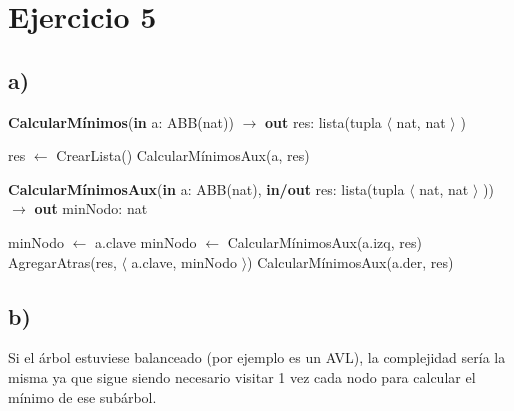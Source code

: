 \section*{Ejercicio 5}

\subsection*{a)}

\begin{algorithm}[H]
\caption{
    \textbf{CalcularMínimos}(\textbf{in} a: ABB(nat)) $\to$ \textbf{out} res: lista(tupla $\langle$ nat, nat $\rangle$ )
}
\begin{algorithmic}[1]
    \State res $\gets$ CrearLista() 
        \State CalcularMínimosAux(a, res) 
    \EndIf
\end{algorithmic}
\end{algorithm}

\begin{algorithm}[H]
\caption{
    \textbf{CalcularMínimosAux}(\textbf{in} a: ABB(nat), \textbf{in/out} res: lista(tupla $\langle$ nat, nat $\rangle$ )) $\to$ \textbf{out} minNodo: nat
}
\begin{algorithmic}[1]
    \State minNodo $\gets$ a.clave
        \State minNodo $\gets$ CalcularMínimosAux(a.izq, res)
    \EndIf
    \State AgregarAtras(res, $\langle$ a.clave, minNodo $\rangle$)
        \State CalcularMínimosAux(a.der, res)
    \EndIf
\end{algorithmic}
\end{algorithm}

\subsection*{b)}

Si el árbol estuviese balanceado (por ejemplo es un AVL), la complejidad sería la misma ya que sigue siendo necesario visitar 1 vez cada nodo para calcular el mínimo de ese subárbol.
